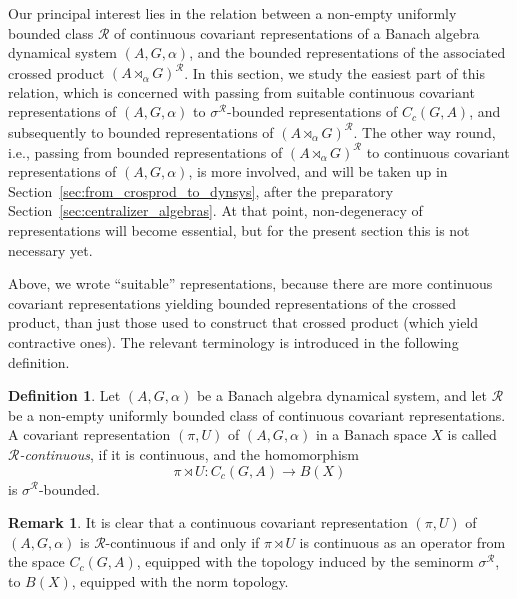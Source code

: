 \documentclass{amsart}
\theoremstyle{plain}
\theoremstyle{definition}
\newtheorem{defn}[theorem]{Definition}
\newtheorem{remark}[theorem]{Remark}
\numberwithin{equation}{section}
\begin{document}
Our principal interest lies in the relation between a non-empty uniformly bounded class ${\mathcal R}$ of continuous covariant representations of a Banach algebra dynamical system ${(A,G,\alpha)}$, and the bounded representations of the associated crossed product ${(A {\rtimes}_\alpha G)^\mathcal{R}}$. In this section, we study the easiest part of this relation, which is concerned with passing from suitable continuous covariant representations of ${(A,G,\alpha)}$ to ${\sigma^{\mathcal R}}$-bounded representations of $C_c(G,A)$, and subsequently to bounded representations of ${(A {\rtimes}_\alpha G)^\mathcal{R}}$. The other way round, i.e., passing from bounded representations of ${(A {\rtimes}_\alpha G)^\mathcal{R}}$ to continuous covariant representations of ${(A,G,\alpha)}$, is more involved, and will be taken up in Section~\ref{sec:from_crosprod_to_dynsys}, after the preparatory Section~\ref{sec:centralizer_algebras}. At that point, non-degeneracy of representations will become essential, but for the present section this is not necessary yet.

Above, we wrote ``suitable'' representations, because there are more continuous covariant representations yielding bounded representations of the crossed product, than just those used to construct that crossed product (which yield contractive ones). The relevant terminology is introduced in the following definition.

\begin{defn}\label{d:affiliated}
Let ${(A,G,\alpha)}$ be a Banach algebra dynamical system, and let ${\mathcal R}$ be a non-empty uniformly bounded class of continuous covariant representations. A covariant representation ${(\pi,U)}$ of ${(A,G,\alpha)}$ in a Banach space $X$ is called \emph{${\mathcal R}$-continuous}, if it is continuous, and the homomorphism
\[
{\pi \rtimes U}: C_c(G,A)\to B(X)
\]
is ${\sigma^{\mathcal R}}$-bounded.
\end{defn}

\begin{remark}\label{r:affiliated_is_bounded}
 It is clear that a continuous covariant representation ${(\pi,U)}$ of ${(A,G,\alpha)}$ is ${\mathcal R}$-continuous if and only if ${\pi \rtimes U}$ is continuous as an operator from the space $C_c(G,A)$, equipped with the topology induced by the seminorm ${\sigma^{\mathcal R}}$, to $B(X)$, equipped with the norm topology.
\end{remark}
\end{document}
